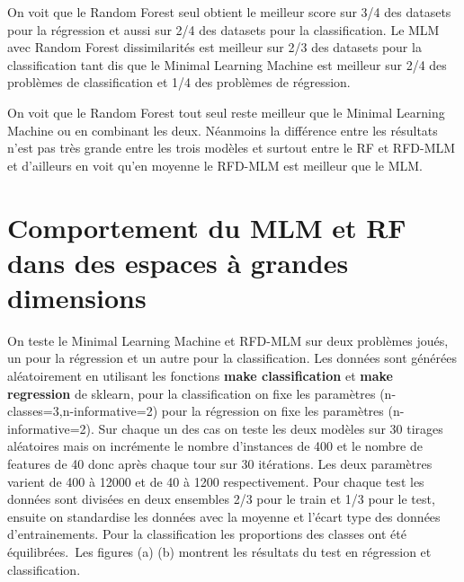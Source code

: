 \documentclass[12pt,a4paper]{report}
\begin{document}
\par On voit que le Random Forest seul obtient le meilleur score sur 3/4 des datasets pour la régression et aussi sur 2/4 des datasets pour la classification. Le MLM avec Random Forest dissimilarités est meilleur sur 2/3 des datasets pour la classification tant dis que le Minimal Learning Machine est meilleur sur 2/4 des problèmes de classification et 1/4 des problèmes de régression.

\par On voit que le Random Forest tout seul reste meilleur que le Minimal Learning Machine ou en combinant les deux. Néanmoins la différence entre les résultats n'est pas très grande entre les trois modèles et surtout entre le RF et RFD-MLM et d'ailleurs en voit qu'en moyenne le RFD-MLM est meilleur que le MLM.  

{\color{MidnightBlue}\section{Comportement du MLM et RF dans des espaces à grandes dimensions}}
\par On teste le Minimal Learning Machine et RFD-MLM sur deux problèmes joués, un pour la régression et un autre pour la classification. Les données sont générées aléatoirement en utilisant les fonctions \textbf{make classification} et \textbf{make regression} de sklearn, pour la classification on fixe les paramètres (n-classes=3,n-informative=2) pour la régression on fixe les paramètres (n-informative=2). Sur chaque un des cas on teste les deux modèles sur 30 tirages aléatoires mais on incrémente le nombre d'instances de 400 et le nombre de features de 40 donc après chaque tour sur 30 itérations. Les deux paramètres varient de 400 à 12000 et de 40 à 1200 respectivement. Pour chaque test les données sont divisées en deux ensembles 2/3 pour le train et 1/3 pour le test, ensuite on standardise les données avec la moyenne et l'écart type des données d'entrainements. Pour la classification les proportions des classes ont été équilibrées.\
Les figures (a) (b) montrent les résultats du test en régression et classification.
\end{document}
